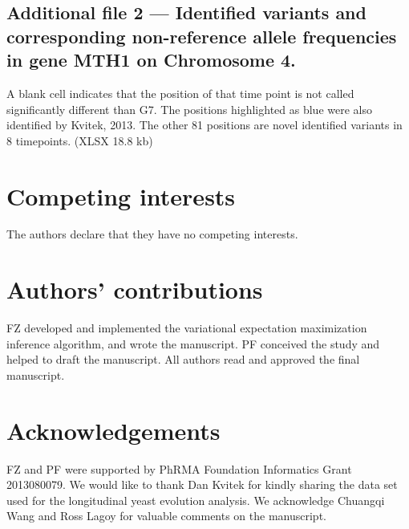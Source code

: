 \documentclass{bmcart}
\begin{document}
  \subsection{Additional file 2 --- Identified variants and corresponding non-reference allele frequencies in gene MTH1 on Chromosome 4.}\label{variants}
	A blank cell indicates that the position of that time point is not called significantly different than G7.
	The positions highlighted as blue were also identified by Kvitek, 2013.
	The other 81 positions are novel identified variants in 8 timepoints. (XLSX 18.8 kb)


\begin{backmatter}

\section{Competing interests}
  The authors declare that they have no competing interests.

\section{Authors' contributions}
FZ developed and implemented the variational expectation maximization inference algorithm, and wrote the manuscript.
PF conceived the study and helped to draft the manuscript.
All authors read and approved the final manuscript.

\section{Acknowledgements}
FZ and PF were supported by PhRMA Foundation Informatics Grant 2013080079.
We would like to thank Dan Kvitek for kindly sharing the data set used for the longitudinal yeast evolution analysis.
We acknowledge Chuangqi Wang and Ross Lagoy for valuable comments on the manuscript.



\end{backmatter}
\end{document}
